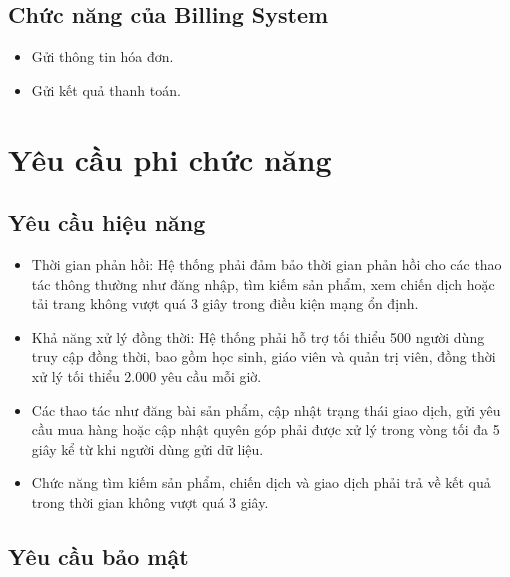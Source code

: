 \documentclass[12pt,a4paper]{report}
\begin{document}
\subsection{Chức năng của Billing System}

\begin{itemize}[label=--, leftmargin=1.2cm]
\item Gửi thông tin hóa đơn.
\item Gửi kết quả thanh toán.
\end{itemize}

\section{Yêu cầu phi chức năng}
\subsection{Yêu cầu hiệu năng}

\begin{itemize}[label=--, leftmargin=1.2cm]
\item Thời gian phản hồi: Hệ thống phải đảm bảo thời gian phản hồi cho các thao tác thông thường như đăng nhập, tìm kiếm sản phẩm, xem chiến dịch hoặc tải trang không vượt quá 3 giây trong điều kiện mạng ổn định.


\item Khả năng xử lý đồng thời: Hệ thống phải hỗ trợ tối thiểu 500 người dùng truy cập đồng thời, bao gồm học sinh, giáo viên và quản trị viên, đồng thời xử lý tối thiểu 2.000 yêu cầu mỗi giờ.

\item Các thao tác như đăng bài sản phẩm, cập nhật trạng thái giao dịch, gửi yêu cầu mua hàng hoặc cập nhật quyên góp phải được xử lý trong vòng tối đa 5 giây kể từ khi người dùng gửi dữ liệu.

\item Chức năng tìm kiếm sản phẩm, chiến dịch và giao dịch phải trả về kết quả trong thời gian không vượt quá 3 giây.


\end{itemize}

\subsection{Yêu cầu bảo mật}
\end{document}
